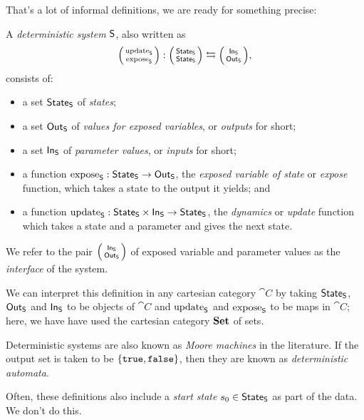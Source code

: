 \documentclass[DynamicalBook]{subfiles}
\begin{document}
That's a lot of informal definitions, we are ready for something precise:
\begin{definition}\label{def.deterministic_system}
  A \emph{deterministic system} $\mathsf{S}$, also written as 
  $$\lens{\update{S}}{\expose{S}} : \lens{\State{S}}{\State{S}} \leftrightarrows \lens{\In{S}}{\Out{S}},$$ 
  consists of:
  \begin{itemize}
    \item a set $\mathsf{State}_{\mathsf{S}}$ of \emph{states};
    \item a set $\mathsf{Out}_{\mathsf{S}}$ of \emph{values for exposed variables}, or \emph{outputs}
      for short;
    \item a set $\mathsf{In}_{\mathsf{S}}$ of \emph{parameter values}, or \emph{inputs} for short;
    \item a function $\mathrm{expose}_{\mathsf{S}} : \mathsf{State}_{\mathsf{S}} \to \mathsf{Out}_{\mathsf{S}}$, the \emph{exposed variable of state} or
      \emph{expose} function, which takes a state to the output it yields; and
    \item a function $\mathrm{update}_{\mathsf{S}} : \mathsf{State}_{\mathsf{S}} \times \mathsf{In}_{\mathsf{S}} \to \mathsf{State}_{\mathsf{S}}$, the \emph{dynamics} or
      \emph{update} function which takes a state and a parameter and gives the
      next state.
  \end{itemize}
  We refer to the pair $\lens{\In{S}}{\Out{S}}$ of exposed variable and parameter values as
  the \emph{interface} of the system.

We can interpret this definition in any cartesian category $\cat{C}$ by taking $\mathsf{State}_{\mathsf{S}}$, $\mathsf{Out}_{\mathsf{S}}$ and $\mathsf{In}_{\mathsf{S}}$ to be objects of $\cat{C}$ and $\mathrm{update}_{\mathsf{S}}$ and $\mathrm{expose}_{\mathsf{S}}$ to be maps in $\cat{C}$; here, we
have have used the cartesian category $\textbf{Set}$ of sets.
\end{definition}

\begin{remark}
  Deterministic systems are also known as \emph{Moore machines} in the
  literature. If the output set is taken to be $\{\mathtt{true},
  \mathtt{false}\}$, then they are known as \emph{deterministic automata}.

  Often, these definitions also include a \emph{start state} $s_0 \in \mathsf{State}_{\mathsf{S}}$
  as part of the data. We don't do this.
\end{remark}
\end{document}
